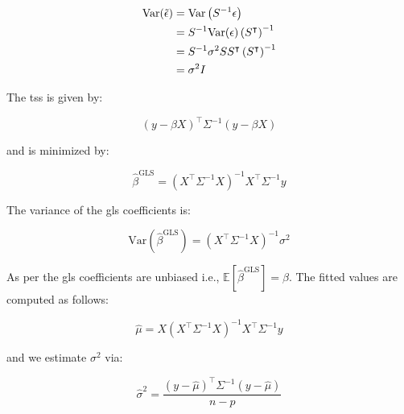 \documentclass{report}
\begin{document}
\begin{equation}\label{eq:ols-gls-error-variance-transformed}
    \begin{aligned}
        \text{Var}(\Tilde{\epsilon})
          &= \text{Var}\left(S^{-1} \epsilon\right) \\
          &= S^{-1}\text{Var}(\epsilon)\left(S^\intercal\right)^{-1} \\
          &= S^{-1} \sigma^2 SS^\intercal \left(S^\intercal\right)^{-1} \\
          &= \sigma^2 I \\
    \end{aligned}
\end{equation}

The \gls{tss} is given by:

\begin{equation}\label{eq:ols-gls-tss}
    (y - \beta X)^\intercal \Sigma^{-1} (y - \beta X)
\end{equation}

and is minimized by:

\begin{equation}\label{eq:ols-gls-solution}
    \hat{\beta}^{\text{GLS}} = \left(X^\intercal \Sigma^{-1} X\right)^{-1} X^\intercal \Sigma^{-1} y
\end{equation}

The variance of the \gls{gls} coefficients is:

\begin{equation}\label{eq:ols-gls-coef-variance}
    \text{Var}\left(\hat{\beta}^{\text{GLS}}\right) = \left(X^\intercal \Sigma^{-1} X\right)^{-1} \sigma^2
\end{equation}

As per \cite[Chapter~2.7.2]{agresti_foundations_2015} the \gls{gls} coefficients are unbiased i.e., $\mathbb{E}\left[\hat{\beta}^{\text{GLS}}\right] = \beta$. The fitted values are computed as follows:

\begin{equation}\label{eq:ols-gls-fitted-values}
    \hat{\mu} = X \left(X^\intercal \Sigma^{-1} X\right)^{-1} X^\intercal \Sigma^{-1} y
\end{equation}

and we estimate $\sigma^2$ via:

\begin{equation}\label{eq:ols-gls-sigma2-estimate}
    \hat{\sigma}^2 = \frac{\left(y - \hat{\mu}\right)^\intercal \Sigma^{-1} \left(y - \hat{\mu}\right)}{n - p}
\end{equation}
\end{document}
